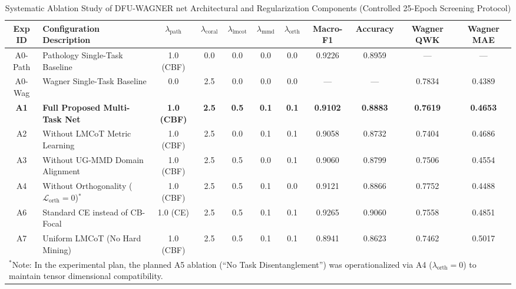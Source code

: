 \documentclass[journal]{IEEEtran}
\begin{document}
\begin{table}[t]
\centering
\caption{Systematic Ablation Study of DFU-WAGNER net Architectural and Regularization Components (Controlled 25-Epoch Screening Protocol)}
\label{tab:ablation}
\begin{tabular}{clccccc@{\hspace{1.5em}}cccc}
\toprule
\textbf{Exp ID} & \textbf{Configuration Description} & $\lambda_{\text{path}}$ & $\lambda_{\text{coral}}$ & $\lambda_{\text{lmcot}}$ & $\lambda_{\text{mmd}}$ & $\lambda_{\text{orth}}$ & \textbf{Macro-F1} & \textbf{Accuracy} & \textbf{Wagner QWK} & \textbf{Wagner MAE} \\
\midrule
A0-Path & Pathology Single-Task Baseline & 1.0 (CBF) & 0.0 & 0.0 & 0.0 & 0.0 & 0.9226 & 0.8959 & --- & --- \\
A0-Wag & Wagner Single-Task Baseline & 0.0 & 2.5 & 0.0 & 0.0 & 0.0 & --- & --- & 0.7834 & 0.4389 \\
\textbf{A1} & \textbf{Full Proposed Multi-Task Net} & \textbf{1.0 (CBF)} & \textbf{2.5} & \textbf{0.5} & \textbf{0.1} & \textbf{0.1} & \textbf{0.9102} & \textbf{0.8883} & \textbf{0.7619} & \textbf{0.4653} \\
A2 & Without LMCoT Metric Learning & 1.0 (CBF) & 2.5 & 0.0 & 0.1 & 0.1 & 0.9058 & 0.8732 & 0.7404 & 0.4686 \\
A3 & Without UG-MMD Domain Alignment & 1.0 (CBF) & 2.5 & 0.5 & 0.0 & 0.1 & 0.9060 & 0.8799 & 0.7506 & 0.4554 \\
A4 & Without Orthogonality ($\mathcal{L}_{\text{orth}} = 0$)$^*$ & 1.0 (CBF) & 2.5 & 0.5 & 0.1 & 0.0 & 0.9121 & 0.8866 & 0.7752 & 0.4488 \\
A6 & Standard CE instead of CB-Focal & 1.0 (CE) & 2.5 & 0.5 & 0.1 & 0.1 & 0.9265 & 0.9060 & 0.7558 & 0.4851 \\
A7 & Uniform LMCoT (No Hard Mining) & 1.0 (CBF) & 2.5 & 0.5 & 0.1 & 0.1 & 0.8941 & 0.8623 & 0.7462 & 0.5017 \\
\bottomrule
\multicolumn{11}{l}{\footnotesize $^*$Note: In the experimental plan, the planned A5 ablation (``No Task Disentanglement'') was operationalized via A4 ($\lambda_{\text{orth}}=0$) to maintain tensor dimensional compatibility.}
\end{tabular}
\end{table}
\end{document}
